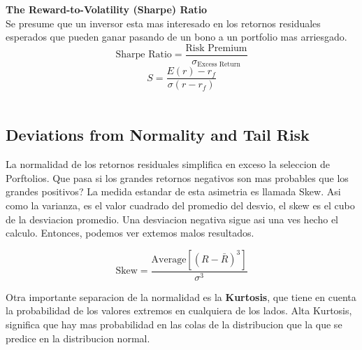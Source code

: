 \documentclass{article}
\begin{document}
\textbf{The Reward-to-Volatility (Sharpe) Ratio}
\\
Se presume que un inversor esta mas interesado en los retornos residuales esperados que pueden ganar pasando de un bono a un portfolio mas 
arriesgado.
\[
\text{Sharpe Ratio} = \frac{\text{Risk Premium}}{\sigma_{\text{Excess Return}}}
\]
\[
S = \frac{E(r) - r_f}{\sigma(r - r_f)}
\]
\\

\subsection{Deviations from Normality and Tail Risk}
La normalidad de los retornos residuales simplifica en exceso la seleccion de Porftolios. Que pasa si los grandes retornos negativos son mas 
probables que los grandes positivos? La medida estandar de esta asimetria es llamada Skew. Asi como la varianza, es el valor cuadrado
del promedio del desvio, el skew es el cubo de la desviacion promedio. Una desviacion negativa sigue asi una ves hecho el calculo. Entonces,
podemos ver extemos malos resultados.

\[
\text{Skew} = \frac{\text{Average}\left[(R - \bar{R})^{3}\right]}{\sigma^{3}}
\]
\begin{center}
\end{center}

\newpage

Otra importante separacion de la normalidad es la \textbf{Kurtosis}, que tiene en cuenta la probabilidad de los valores extremos en cualquiera de los lados.
 Alta Kurtosis, significa que hay mas probabilidad en las colas de la distribucion que la que se predice en la distribucion normal.
\\
\end{document}
